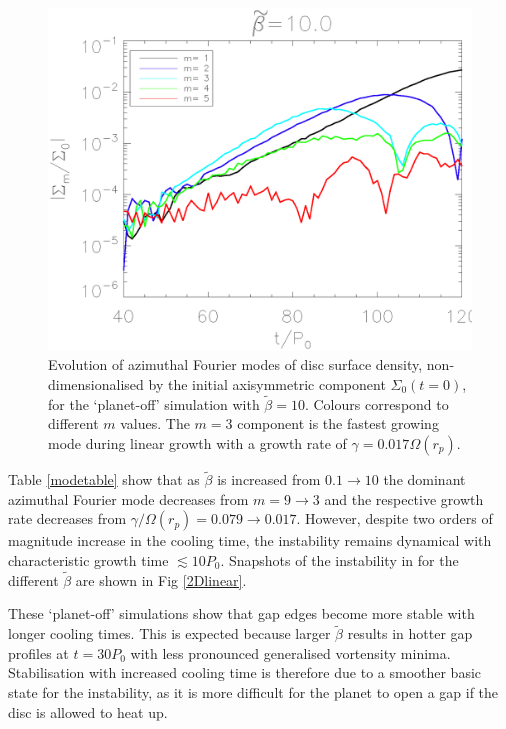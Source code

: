 \begin{figure}
  \includegraphics[width=\linewidth,clip=true,trim=1.2cm
  0cm 0cm 0cm]{figures/linear_stability}
  \caption{Evolution of azimuthal Fourier modes of disc surface
    density, non-dimensionalised by the initial axisymmetric component 
    $\Sigma_0(t=0)$, for the
    `planet-off' simulation with $\tilde{\beta}=10$. Colours correspond
    to different $m$ values. The $m=3$ component is the fastest growing
    mode during linear growth with a growth rate of 
    $\gamma=0.017\Omega(r_p)$.\label{linearmodes}}
\end{figure}


Table \ref{modetable} show that as
$\tilde{\beta}$ is increased from $ 0.1\rightarrow10$ the dominant
azimuthal Fourier mode decreases from $ m=9\rightarrow3$ and the
respective growth rate decreases from $ \gamma/\Omega(r_p)=0.079
\rightarrow 0.017$. However, despite two orders of magnitude increase in the
cooling time, the instability remains dynamical with characteristic  growth time
$\lesssim 10P_0$. Snapshots of the instability in for  
the different $\tilde\beta$ are shown in Fig \ref{2Dlinear}. 

These `planet-off' simulations show that gap edges become more stable with
longer cooling times. This is expected because larger $\tilde{\beta}$
results in hotter gap profiles at $t=30P_0$ with less pronounced
generalised vortensity minima. Stabilisation with increased
cooling time is therefore due to a smoother basic state for the
instability, as it is more difficult for the planet to open a gap if
the disc is allowed to heat up. 

